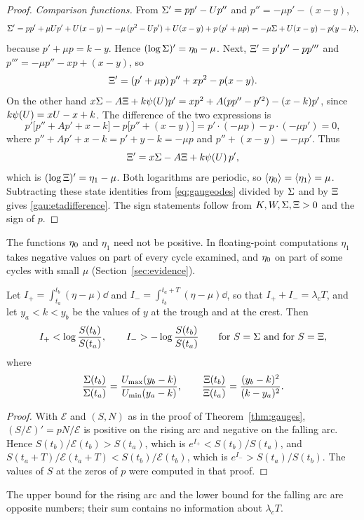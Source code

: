 \begin{proof}
\emph{Comparison functions.} From $\Sigma'=pp'-Up''$ and $p''=-\mu p'-(x-y)$,
\[
\Sigma'=pp'+\mu Up'+U(x-y)=-\mu\,(p^2-Up')+U(x-y)+p\,(p'+\mu p)=-\mu\Sigma+U(x-y)-p(y-k),
\]
because $p'+\mu p=k-y$. Hence $(\log\Sigma)'=\eta_0-\mu$. Next, $\Xi'=p'p''-pp'''$ and $p'''=-\mu p''-xp+(x-y)$, so
\[
\Xi'=(p'+\mu p)\,p''+xp^2-p(x-y).
\]
On the other hand $x\Sigma-A\Xi+k\psi(U)p'=xp^2+A(pp''-p'^2)-(x-k)p'$, since $k\psi(U)=xU-x+k$. The difference of the two expressions is
\[
p'\bigl[p''+Ap'+x-k\bigr]-p\bigl[p''+(x-y)\bigr]=p'\cdot(-\mu p)-p\cdot(-\mu p')=0,
\]
where $p''+Ap'+x-k=p'+y-k=-\mu p$ and $p''+(x-y)=-\mu p'$. Thus
\begin{equation}\label{gau:Xistate}
\Xi'=x\Sigma-A\Xi+k\psi(U)\,p',
\end{equation}
which is $(\log\Xi)'=\eta_1-\mu$. Both logarithms are periodic, so $\left\langle \eta_0\right\rangle=\left\langle \eta_1\right\rangle=\mu$. Subtracting these state identities from \eqref{eq:gaugeodes} divided by $\Sigma$ and by $\Xi$ gives \eqref{gau:etadifference}. The sign statements follow from $K,W,\Sigma,\Xi>0$ and the sign of $p$.
\end{proof}

The functions $\eta_0$ and $\eta_1$ need not be positive. In floating-point computations $\eta_1$ takes negative values on part of every cycle examined, and $\eta_0$ on part of some cycles with small $\mu$ (Section~\ref{sec:evidence}).

\begin{corollary}\label{gau:halfcycle}
Let $I_+=\int_{t_a}^{t_b}(\eta-\mu)\dd$ and $I_-=\int_{t_b}^{t_a+T}(\eta-\mu)\dd$, so that $I_++I_-=\lambda_cT$, and let $y_a<k<y_b$ be the values of $y$ at the trough and at the crest. Then
\[
I_+<\log\frac{S(t_b)}{S(t_a)},\qquad I_->-\log\frac{S(t_b)}{S(t_a)}\qquad\text{for }S=\Sigma\text{ and for }S=\Xi,
\]
where
\[
\frac{\Sigma(t_b)}{\Sigma(t_a)}=\frac{U_{\max}(y_b-k)}{U_{\min}(y_a-k)},\qquad
\frac{\Xi(t_b)}{\Xi(t_a)}=\frac{(y_b-k)^2}{(k-y_a)^2}.
\]
\end{corollary}
\begin{proof}
With $\mathcal E$ and $(S,N)$ as in the proof of Theorem~\ref{thm:gauges}, $(S/\mathcal E)'=pN/\mathcal E$ is positive on the rising arc and negative on the falling arc. Hence $S(t_b)/\mathcal E(t_b)>S(t_a)$, which is $e^{I_+}<S(t_b)/S(t_a)$, and $S(t_a+T)/\mathcal E(t_a+T)<S(t_b)/\mathcal E(t_b)$, which is $e^{I_-}>S(t_a)/S(t_b)$. The values of $S$ at the zeros of $p$ were computed in that proof.
\end{proof}
The upper bound for the rising arc and the lower bound for the falling arc are opposite numbers; their sum contains no information about $\lambda_cT$.

